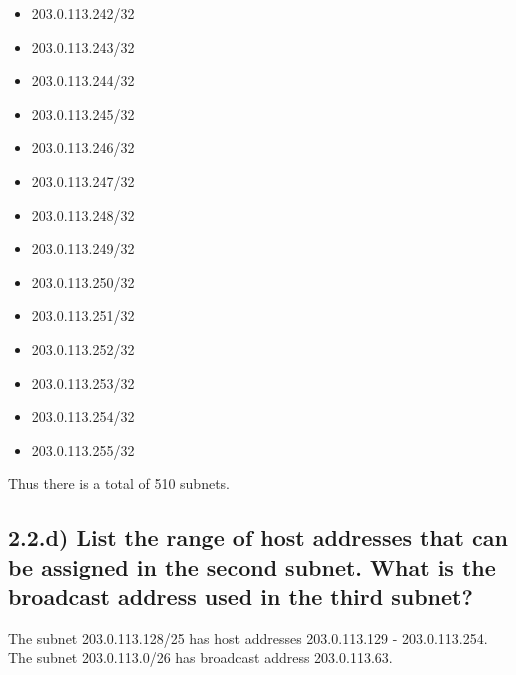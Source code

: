 \documentclass[a4paper,10pt]{article}
\begin{document}
\begin{itemize}
  \item 203.0.113.242/32
  \item 203.0.113.243/32
  \item 203.0.113.244/32
  \item 203.0.113.245/32
  \item 203.0.113.246/32
  \item 203.0.113.247/32
  \item 203.0.113.248/32
  \item 203.0.113.249/32
  \item 203.0.113.250/32
  \item 203.0.113.251/32
  \item 203.0.113.252/32
  \item 203.0.113.253/32
  \item 203.0.113.254/32
  \item 203.0.113.255/32
\end{itemize}
Thus there is a total of 510 subnets.
\subsection{2.2.d) List the range of host addresses that can be assigned in the second subnet. What is the broadcast address used in the third subnet?}
The subnet 203.0.113.128/25 has host addresses 203.0.113.129 - 203.0.113.254. The subnet 203.0.113.0/26 has broadcast address 203.0.113.63.
\end{document}
